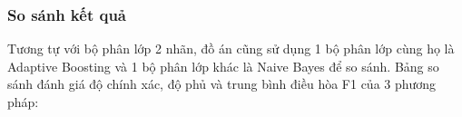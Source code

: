 
\subsubsection*{So sánh kết quả}
Tương tự với bộ phân lớp 2 nhãn, đồ án cũng sử dụng 1 bộ phân lớp cùng họ là Adaptive Boosting và 1 bộ phân lớp khác là Naive Bayes để so sánh. Bảng so sánh đánh giá độ chính xác, độ phủ và trung bình điều hòa F1 của 3 phương pháp:


